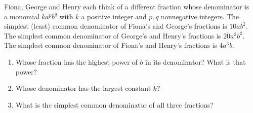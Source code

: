 Fiona, George and Henry each think of a different fraction whose denominator is a monomial $ka^pb^q$ with $k$ a positive integer and $p,q$ nonnegative integers. The simplest (least) common denominator of Fiona's and George's fractions is $10ab^2$. The simplest common denominator of George's and Henry's fractions is $20a^3b^2$. The simplest common denominator of Fiona's and Henry's fractions is $4a^3b$.
\begin{enumerate}
\item[(a)] Whose fraction has the highest power of $b$ in its denominator? What is that power?
\item[(b)] Whose denominator has the largest constant $k$?
\item[(c)] What is the simplest common denominator of all three fractions?
\end{enumerate}
